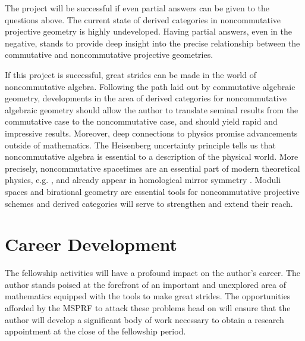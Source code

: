 \documentclass[11pt]{article}
\begin{document}

The project will be successful if even partial answers can be given to the questions above.
The current state of derived categories in noncommutative projective geometry is highly undeveloped.
Having partial answers, even in the negative, stands to provide deep insight into the precise relationship between the commutative and noncommutative projective geometries.

If this project is successful, great strides can be made in the world of noncommutative algebra.
Following the path laid out by commutative algebraic geometry, developments in the area of derived categories for noncommutative algebraic geometry should allow the author to translate seminal results from the commutative case to the noncommutative case, and should yield rapid and impressive results.
Moreover, deep connections to physics promise advancements outside of mathematics.
The Heisenberg uncertainty principle tells us that noncommutative algebra is essential to a description of the physical world.
More precisely, noncommutative spacetimes are an essential part of modern theoretical physics, e.g. \cite{DoNe01}, and already appear in homological mirror symmetry \cite{AKO08}.
Moduli spaces and birational geometry are essential tools for noncommutative projective schemes and derived categories will serve to strengthen and extend their reach.



\section{Career Development}
The fellowship activities will have a profound impact on the author's career.
The author stands poised at the forefront of an important and unexplored area of mathematics equipped with the tools to make great strides.
The opportunities afforded by the MSPRF to attack these problems head on will ensure that the author will develop a significant body of work necessary to obtain a research appointment at the close of the fellowship period.
\end{document}
